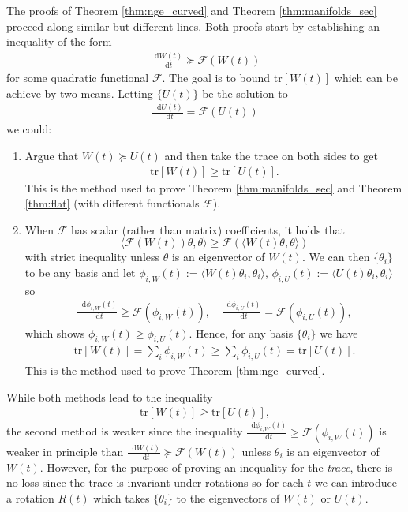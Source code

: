 \documentclass[a4paper,twoside,11pt,reqno]{amsart}
\newcommand*\diff{\mathop{}\!\mathrm{d}}
\newcommand{\mr}{\mathrm}
\begin{document}
The proofs of Theorem \ref{thm:nge_curved} and Theorem \ref{thm:manifolds_sec} proceed along similar but different lines. Both proofs start by establishing an inequality of the form 
\begin{align}
\frac{\diff W(t)}{\diff t} \succeq \mathcal F(W(t))
\end{align}
for some quadratic functional $\mathcal F$. The goal is to bound $\mr{tr}[W(t)]$ which can be achieve by two means. Letting $\{U(t)\}$ be the solution to 
\begin{align}
\frac{\diff U(t)}{\diff t} = \mathcal F(U(t))
\end{align}
we could:
\begin{enumerate}
\item Argue that $W(t)\succeq U(t)$ and then take the trace on both sides to get 
\begin{align}
\mr{tr}[W(t)]\ge\mr{tr}[U(t)].
\end{align}
This is the method used to prove Theorem \ref{thm:manifolds_sec}  and  Theorem \ref{thm:flat} (with different functionals $\mathcal F$).
\item  When $\mathcal F$ has scalar (rather than matrix) coefficients, it holds that 
\begin{equation}
\langle \mathcal F(W(t))\theta,\theta\rangle \ge  \mathcal F(\langle W(t)\theta,\theta\rangle)
\end{equation}
 with strict inequality unless $\theta$ is an eigenvector of $W(t)$. We can then $\{\theta_i\}$ to be any basis and let $\phi_{i,W}(t):=\langle W(t)\theta_i,\theta_i\rangle$, $\phi_{i,U}(t):=\langle U(t)\theta_i,\theta_i\rangle$ so
\begin{align}
\frac{\diff \phi_{i,W}(t)}{\diff t}\ge \mathcal F(\phi_{i,W}(t)), \quad \frac{\diff \phi_{i,U}(t)}{\diff t}=\mathcal F(\phi_{i,U}(t)),
\end{align}
which shows $\phi_{i,W}(t)\ge \phi_{i,U}(t)$. Hence, for any basis $\{\theta_i\}$ we have
\begin{align}
\mr{tr}[W(t)]=\sum_i\phi_{i,W}(t)\ge \sum_i\phi_{i,U}(t)= \mr{tr}[U(t)].
\end{align}
This is the method used to prove Theorem \ref{thm:nge_curved}.
\end{enumerate}
While both methods lead to the inequality 
\begin{align}
\mr{tr}[W(t)]\ge \mr{tr}[U(t)],
\end{align}
the second method is weaker since  the inequality $\frac{\diff \phi_{i,W}(t)}{\diff t}\ge \mathcal F(\phi_{i,W}(t))$ is weaker in principle than $\frac{\diff W(t)}{\diff t} \succeq \mathcal F(W(t))$ unless $\theta_i$ is an eigenvector of $W(t)$. However, for the purpose of proving an inequality for the \emph{trace}, there is no loss since the trace is invariant under rotations so for each $t$ we can introduce a rotation $R(t)$ which takes $\{\theta_i\}$ to the eigenvectors of $W(t)$ or $U(t)$.




\end{document}
